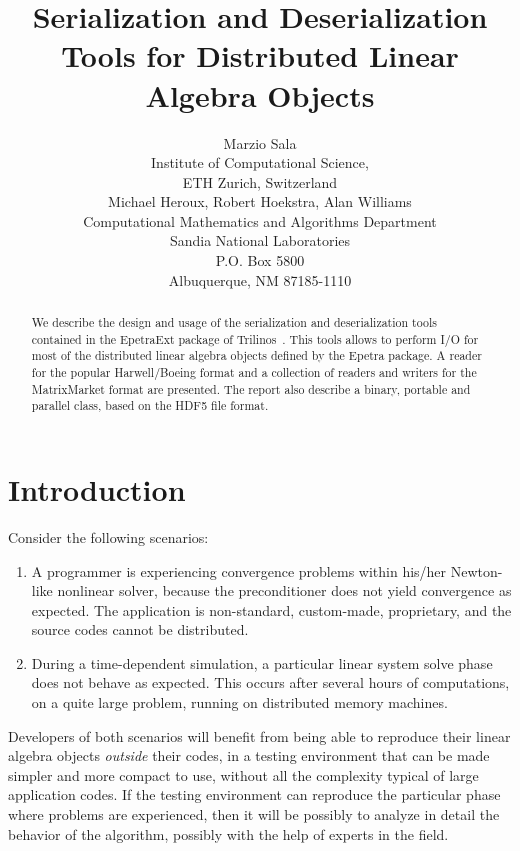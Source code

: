 \documentclass[11pt,relax]{SANDreport}
\author{Marzio Sala \\
Institute of Computational Science, \\
ETH Zurich, Switzerland \\[1cm]
Michael Heroux,   Robert Hoekstra, Alan Williams\\
Computational Mathematics and Algorithms Department \\
Sandia National Laboratories \\
P.O. Box 5800 \\
Albuquerque, NM 87185-1110 \\
}
\title{Serialization and Deserialization Tools for Distributed Linear Algebra Objects}
\begin{document}
\maketitle

\begin{abstract}
We describe the design and usage of the serialization and deserialization
tools contained in the EpetraExt package of
Trilinos~\cite{trilinos-home-page}. This tools allows to perform I/O for most
of the distributed linear algebra objects defined by the Epetra package. A
reader for the popular Harwell/Boeing format and a collection of readers and
writers for the MatrixMarket format are presented. The report also describe a
binary, portable and parallel class, based on the HDF5 file format.
\end{abstract}

\SANDmain

\tableofcontents

\newpage

\section{Introduction}
\label{sec:introduction}

Consider the following scenarios:
\begin{enumerate}
\item A programmer is experiencing convergence
problems within his/her Newton-like nonlinear solver, because the
preconditioner does not yield convergence as expected. The application is
non-standard, custom-made, proprietary, and the source codes cannot be
distributed.
\item During a time-dependent
simulation, a particular linear system solve phase does not behave as expected.
This occurs after several
hours of computations, on a quite large problem, running on distributed memory
machines.
\end{enumerate}
Developers of both scenarios will benefit from being able to reproduce their
linear algebra objects {\sl outside} their codes, in a testing environment that
can be made simpler and more compact to use, without all the complexity
typical of large application codes. If the testing environment  can
reproduce the particular phase where problems are experienced, then it will be
possibly to analyze in detail the behavior of the algorithm, possibly with the
help of experts in the field.
\end{document}
